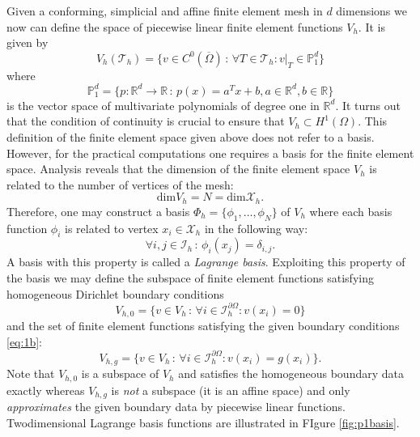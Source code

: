 \documentclass[a4paper,12pt]{article}
\begin{document}
Given a conforming, simplicial and affine finite element mesh in $d$ dimensions we
now can define the space of piecewise linear finite element functions $V_h$.
It is given by
\begin{equation}
V_h(\mathcal{T}_h) = \{ v\in C^0(\overline{\Omega}) \,:\, 
\forall T\in\mathcal{T}_h : v|_T\in\mathbb{P}_1^d\}
\label{eq:Vh}
\end{equation}
where $$\mathbb{P}_1^d = \{ p : \mathbb{R}^d \to \mathbb{R}
\,:\, p(x) = a^Tx+ b, a\in\mathbb{R}^d, b\in\mathbb{R}\}$$
is the vector space of multivariate polynomials of degree one in $\mathbb{R}^d$.
It turns out that the condition of continuity is crucial to ensure that $V_h\subset H^1(\Omega)$.
This definition of the finite element space given above does not refer to a basis.
However, for the practical computations one requires a basis for the
finite element space. Analysis reveals that the dimension of the finite element
space $V_h$ is related to the number of vertices of the mesh:
$$\text{dim} V_h = N = \text{dim} \mathcal{X}_h.$$
Therefore, one may construct a basis $\Phi_h=\{\phi_1,\ldots,\phi_N\}$ of $V_h$ 
where each basis function $\phi_i$ is related to vertex $x_i\in\mathcal{X}_h$ in the following way:
\begin{equation*}
\forall i,j\in\mathcal{I}_h \,:\, \phi_i(x_j) = \delta_{i,j}. 
\end{equation*}
A basis with this property is called a {\em Lagrange basis}.
Exploiting this property of the basis we may define the subspace of
finite element functions satisfying homogeneous Dirichlet boundary conditions
\begin{equation*}
V_{h,0} = \{v\in V_h \,:\, \forall i\in\mathcal{I}_h^{\partial\Omega} : v(x_i)=0\}
\end{equation*}
and the set of finite element functions satisfying the
given boundary conditions \eqref{eq:1b}:
\begin{equation*}
V_{h,g} = \{v\in V_h \,:\, \forall i\in\mathcal{I}_h^{\partial\Omega} : v(x_i)=g(x_i)\}.
\end{equation*}
Note that $V_{h,0}$ is a subspace of $V_h$ and satisfies the homogeneous
boundary data exactly whereas $V_{h,g}$ is {\em not} a subspace (it is an affine space)
and only {\em approximates} the given boundary data by piecewise linear functions.
Twodimensional Lagrange basis functions are illustrated in FIgure \ref{fig:p1basis}.
\end{document}
